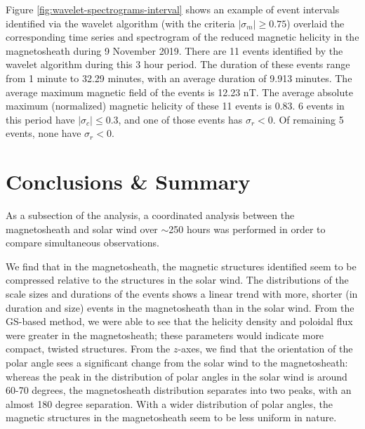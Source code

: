 Figure \ref{fig:wavelet-spectrograms-interval} shows an example of event intervals identified via the wavelet algorithm (with the criteria $|\sigma_m|\geq 0.75$) overlaid the corresponding time series and spectrogram of the reduced magnetic helicity in the magnetosheath during 9 November 2019. There are 11 events identified by the wavelet algorithm during this 3 hour period. The duration of these events range from 1 minute to 32.29 minutes, with an average duration of 9.913 minutes. The average maximum magnetic field of the events is 12.23 nT. The average absolute maximum (normalized) magnetic helicity of these 11 events is 0.83. 6 events in this period have $|\sigma_c|\leq 0.3$, and one of those events has $\sigma_r<0$. Of remaining 5 events, none have $\sigma_r<0$.


\section{Conclusions \& Summary}
As a subsection of the analysis, a coordinated analysis between the magnetosheath and solar wind over $\sim$250 hours was performed in order to compare simultaneous observations. 

We find that in the magnetosheath, the magnetic structures identified seem to be compressed relative to the structures in the solar wind. The distributions of the scale sizes and durations of the events shows a linear trend with more, shorter (in duration and size) events in the magnetosheath than in the solar wind. From the GS-based method, we were able to see that the helicity density and poloidal flux were greater in the magnetosheath; these parameters would indicate more compact, twisted structures. From the $z$-axes, we find that the orientation of the polar angle sees a significant change from the solar wind to the magnetosheath: whereas the peak in the distribution of polar angles in the solar wind is around 60-70 degrees, the magnetosheath distribution separates into two peaks, with an almost 180 degree separation. With a wider distribution of polar angles, the magnetic structures in the magnetosheath seem to be less uniform in nature.

